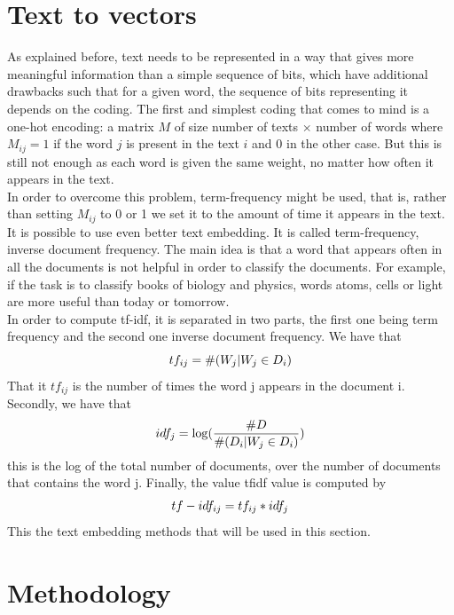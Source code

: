 \section{Text to vectors}
As explained before, text needs to be represented in a way that gives more meaningful information than a simple sequence of bits, which have additional drawbacks such that for a given word, the sequence of bits representing it depends on the coding.
 The first and simplest coding that comes to mind is a one-hot encoding: a matrix $M$ of size number of texts $\times$ number of words where $M_{ij} = 1$ if the word $j$ is present in the text  $i$ and $0$ in the other case. But this is still not enough as each word is given the same weight, no matter how often it appears in the text. \\ 
 In order to overcome this problem, term-frequency might be used, that is, rather than setting $M_{ij}$ to 0 or 1 we set it to the amount of time it appears in the text. \\ 
 It is possible to use even better text embedding. It is called term-frequency, inverse document frequency. The main idea is that a word that appears often in all the documents is not helpful in order to classify the documents. For example, if the task is to classify books of biology and physics, words atoms, cells or light are more useful than today or tomorrow. \\
In order to compute tf-idf, it is separated in two parts, the first one being term frequency and the second one inverse document frequency. We have that \begin{equation}
 tf_{ij} = \#(W_j | W_j \in D_i)\\ 
\end{equation}
That it $tf_{ij}$ is the number of times the word j appears in the document i. 
Secondly, we have that \begin{equation*}
 idf_{j} = \log(\frac{\#D}{\#(D_i | W_j \in D_i)}) \\
\end{equation*}
this is the log of the total number of documents, over the number of documents that contains the word j.
Finally, the value tfidf value is computed by \begin{equation}
 tf-idf_{ij} = tf_{ij} * idf_{j} \\
\end{equation}
This the text embedding methods that will be used in this section. 
\section{Methodology}

